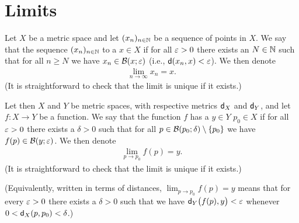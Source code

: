 \section{Limits}

\begin{definition}[Limit]
  \label{def:limit}
  Let $X$ be a metric space and
  let $(x_n)_{n \in \mathbb{N}}$ be a sequence of points in $X$.
  We say that the sequence $(x_n)_{n \in \mathbb{N}}$ 
  to a  $x \in X$
  if for all $\varepsilon > 0$ there exists an $N \in \mathbb{N}$ such that
  for all $n \ge N$ we have $x_n \in \mathcal{B}(x; \varepsilon)$
  (i.e., $\mathsf{d}(x_n,x) < \varepsilon$).
  We then denote
  \begin{align*}
    \lim_{n \to \infty} x_n = x .
  \end{align*}
  (It is straightforward to check that the limit is
  unique if it exists.)

  Let then $X$ and $Y$ be metric spaces, with respective metrics
  $\mathsf{d}_X$ and $\mathsf{d}_Y$, and
  let $f \colon X \to Y$ be a function.
  We say that the function $f$ has a  $y \in Y$
   $p_0 \in X$
  if for all $\varepsilon > 0$ there exists a $\delta > 0$ such that
  for all $p \in \mathcal{B}(p_0; \delta) \setminus \left\{ p_0 \right\}$
  we have $f(p) \in \mathcal{B}(y; \varepsilon)$.
  We then denote
  \begin{align*}
    \lim_{p \to p_0} f(p) = y .
  \end{align*}
  (It is straightforward to check that the limit is
  unique if it exists.)

  (Equivalently, written in terms of distances,
  $\lim_{p \to p_0} f(p) = y$ means that
  for every $\varepsilon > 0$ there exists a $\delta > 0$ such that
  we have $\mathsf{d}_Y \big( f(p), y \big) < \varepsilon$ whenever
  $0 < \mathsf{d}_X (p,p_0) < \delta$.)
\end{definition}

